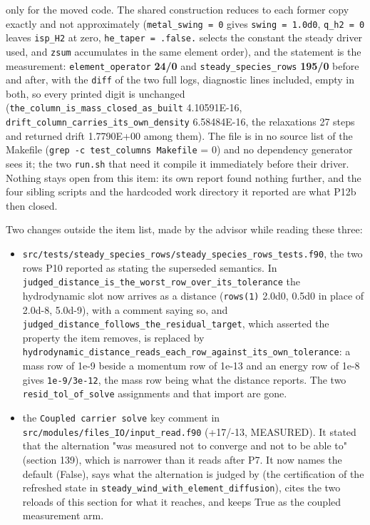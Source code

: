 \documentclass[english,a4paper]{my_memo}
\providecommand{\tightlist}{\setlength{\itemsep}{0pt}\setlength{\parskip}{0pt}}
\begin{document}
\begin{itemize}
  only for the moved code. The shared construction reduces to each former copy
  exactly and not approximately (\texttt{metal\_swing\ =\ 0} gives \texttt{swing\ =\ 1.0d0},
  \texttt{q\_h2\ =\ 0} leaves \texttt{isp\_H2} at zero, \texttt{he\_taper\ =\ .false.} selects the
  constant the steady driver used, and \texttt{zsum} accumulates in the same element
  order), and the statement is the measurement: \texttt{element\_operator} \textbf{24/0}
  and \texttt{steady\_species\_rows} \textbf{195/0} before and after, with the \texttt{diff} of the
  two full logs, diagnostic lines included, empty in both, so every printed
  digit is unchanged (\texttt{the\_column\_is\_mass\_closed\_as\_built} 4.10591E-16,
  \texttt{drift\_column\_carries\_its\_own\_density} 6.58484E-16, the relaxation\textquotesingle s 27
  steps and returned drift 1.7790E+00 among them). The file is in no source
  list of the Makefile (\texttt{grep\ -c\ test\_columns\ Makefile} = 0) and no dependency
  generator sees it; the two \texttt{run.sh} that need it compile it immediately
  before their driver. Nothing stays open from this item: its own report
  found nothing further, and the four sibling scripts and the hardcoded work
  directory it reported are what P12b then closed.
\end{itemize}

Two changes outside the item list, made by the advisor while reading these
three:

\begin{itemize}
\tightlist
\item
  \texttt{src/tests/steady\_species\_rows/steady\_species\_rows\_tests.f90}, the two rows
  P10 reported as stating the superseded semantics. In
  \texttt{judged\_distance\_is\_the\_worst\_row\_over\_its\_tolerance} the hydrodynamic slot
  now arrives as a distance (\texttt{rows(1)} 2.0d0, 0.5d0 in place of 2.0d-8,
  5.0d-9), with a comment saying so, and
  \texttt{judged\_distance\_follows\_the\_residual\_target}, which asserted the property
  the item removes, is replaced by
  \texttt{hydrodynamic\_distance\_reads\_each\_row\_against\_its\_own\_tolerance}: a mass row
  of 1e-9 beside a momentum row of 1e-13 and an energy row of 1e-8 gives
  \texttt{1e-9/3e-12}, the mass row being what the distance reports. The two
  \texttt{resid\_tol\_of\_solve} assignments and that import are gone.
\item
  the \texttt{Coupled\ carrier\ solve} key comment in
  \texttt{src/modules/files\_IO/input\_read.f90} (+17/-13, MEASURED). It stated that
  the alternation "was measured not to converge and not to be able to"
  (section 139), which is narrower than it reads after P7. It now names the
  default (False), says what the alternation is judged by (the certification
  of the refreshed state in \texttt{steady\_wind\_with\_element\_diffusion}), cites the
  two reloads of this section for what it reaches, and keeps True as the
  coupled measurement arm.
\end{itemize}
\end{document}

